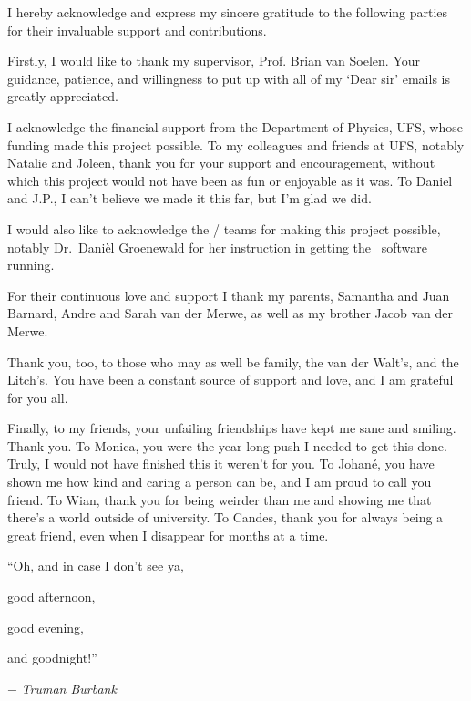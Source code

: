 \begin{acknowledgements}

    \baselineskip

    I hereby acknowledge and express my sincere gratitude to the following parties for their invaluable support and contributions.

    Firstly, I would like to thank my supervisor, Prof. Brian van Soelen.
    Your guidance, patience, and willingness to put up with all of my `Dear sir' emails is greatly appreciated.

    I acknowledge the financial support from the Department of Physics, UFS, whose funding made this project possible.
    To my colleagues and friends at UFS, notably Natalie and Joleen, thank you for your support and encouragement, without which this project would not have been as fun or enjoyable as it was.
    To Daniel and J.P., I can't believe we made it this far, but I'm glad we did.
    
    I would also like to acknowledge the / teams for making this project possible, notably Dr.~Dani\`el Groenewald for her instruction in getting the \polsalt\ software running.
    
    
    For their continuous love and support I thank my parents, Samantha and Juan Barnard, Andre and Sarah van der Merwe, as well as my brother Jacob van der Merwe.

    Thank you, too, to those who may as well be family, the van der Walt's, and the Litch's.
    You have been a constant source of support and love, and I am grateful for you all.
    
    Finally, to my friends, your unfailing friendships have kept me sane and smiling.
    Thank you.
    To Monica, you were the year-long push I needed to get this done.
    Truly, I would not have finished this it weren't for you.
    To Johan\'e, you have shown me how kind and caring a person can be, and I am proud to call you friend.
    To Wian, thank you for being weirder than me and showing me that there's a world outside of university.
    To Candes, thank you for always being a great friend, even when I disappear for months at a time.

    
    \begin{flushright} \baselineskip

        ``Oh, and in case I don't see ya,

        good afternoon,

        good evening,

        and goodnight!''\!\!\!

        \vspace{\baselineskip}
        
        $-$ \textit{Truman Burbank}

    \end{flushright}

\end{acknowledgements}
